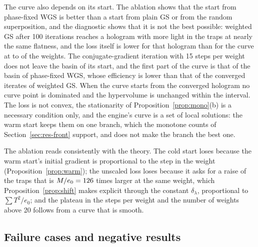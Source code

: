 The curve also depends on its start. The ablation shows that the start from phase-fixed WGS is better than a start from plain GS or from the random superposition, and the diagnostic shows that it is not the best possible: weighted GS after 100 iterations reaches a hologram with more light in the traps at nearly the same flatness, and the loss itself is lower for that hologram than for the curve at \diagGswHundredMin{} to \diagGswHundredMax{} of the weights. The conjugate-gradient iteration with 15 steps per weight does not leave the basin of its start, and the first part of the curve
is that of the basin of phase-fixed WGS, whose efficiency is lower than that of the converged iterates of weighted GS. When the curve starts from the converged hologram no curve point is dominated and the hypervolume is unchanged within the interval. The loss is not convex, the stationarity of Proposition~\ref{prop:mono}(b) is a necessary condition only, and the engine's curve is a set of local solutions: the warm start keeps them on one branch, which the monotone counts of Section~\ref{sec:res-front} support, and does not make the branch the best one.

The ablation reads consistently with the theory. The cold start loses because the warm start's initial gradient is proportional to the step in the weight (Proposition~\ref{prop:warm}); the unscaled loss loses because it asks for a raise of the traps that is $M/e_0=126{}$ times larger at the same weight, which Proposition~\ref{prop:shift} makes explicit through the constant $\delta_\lambda$, proportional to $\sum T^2/e_0$; and the plateau in the steps per weight and the number of weights above 20 follows from a curve that is smooth.

\subsection{Failure cases and negative results}\label{sec:disc-failures}

